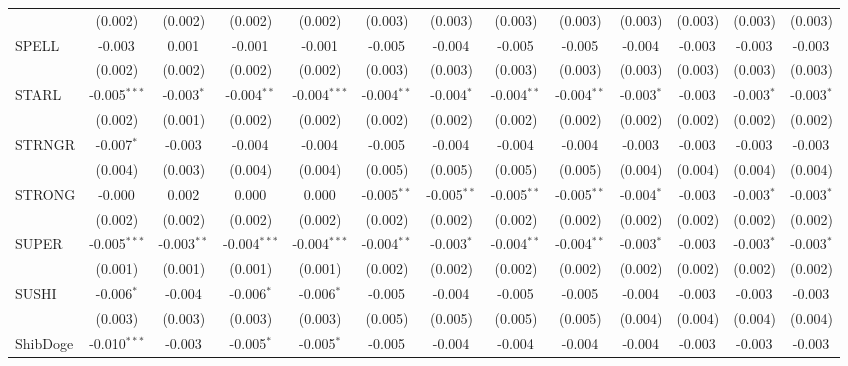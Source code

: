 \begin{table}[!htbp]
\begin{tabular}{@{\extracolsep{5pt}}lcccccccccccc}
  & (0.002) & (0.002) & (0.002) & (0.002) & (0.003) & (0.003) & (0.003) & (0.003) & (0.003) & (0.003) & (0.003) & (0.003) \\
 SPELL & -0.003$^{}$ & 0.001$^{}$ & -0.001$^{}$ & -0.001$^{}$ & -0.005$^{}$ & -0.004$^{}$ & -0.005$^{}$ & -0.005$^{}$ & -0.004$^{}$ & -0.003$^{}$ & -0.003$^{}$ & -0.003$^{}$ \\
  & (0.002) & (0.002) & (0.002) & (0.002) & (0.003) & (0.003) & (0.003) & (0.003) & (0.003) & (0.003) & (0.003) & (0.003) \\
 STARL & -0.005$^{***}$ & -0.003$^{*}$ & -0.004$^{**}$ & -0.004$^{***}$ & -0.004$^{**}$ & -0.004$^{*}$ & -0.004$^{**}$ & -0.004$^{**}$ & -0.003$^{*}$ & -0.003$^{}$ & -0.003$^{*}$ & -0.003$^{*}$ \\
  & (0.002) & (0.001) & (0.002) & (0.002) & (0.002) & (0.002) & (0.002) & (0.002) & (0.002) & (0.002) & (0.002) & (0.002) \\
 STRNGR & -0.007$^{*}$ & -0.003$^{}$ & -0.004$^{}$ & -0.004$^{}$ & -0.005$^{}$ & -0.004$^{}$ & -0.004$^{}$ & -0.004$^{}$ & -0.003$^{}$ & -0.003$^{}$ & -0.003$^{}$ & -0.003$^{}$ \\
  & (0.004) & (0.003) & (0.004) & (0.004) & (0.005) & (0.005) & (0.005) & (0.005) & (0.004) & (0.004) & (0.004) & (0.004) \\
 STRONG & -0.000$^{}$ & 0.002$^{}$ & 0.000$^{}$ & 0.000$^{}$ & -0.005$^{**}$ & -0.005$^{**}$ & -0.005$^{**}$ & -0.005$^{**}$ & -0.004$^{*}$ & -0.003$^{}$ & -0.003$^{*}$ & -0.003$^{*}$ \\
  & (0.002) & (0.002) & (0.002) & (0.002) & (0.002) & (0.002) & (0.002) & (0.002) & (0.002) & (0.002) & (0.002) & (0.002) \\
 SUPER & -0.005$^{***}$ & -0.003$^{**}$ & -0.004$^{***}$ & -0.004$^{***}$ & -0.004$^{**}$ & -0.003$^{*}$ & -0.004$^{**}$ & -0.004$^{**}$ & -0.003$^{*}$ & -0.003$^{}$ & -0.003$^{*}$ & -0.003$^{*}$ \\
  & (0.001) & (0.001) & (0.001) & (0.001) & (0.002) & (0.002) & (0.002) & (0.002) & (0.002) & (0.002) & (0.002) & (0.002) \\
 SUSHI & -0.006$^{*}$ & -0.004$^{}$ & -0.006$^{*}$ & -0.006$^{*}$ & -0.005$^{}$ & -0.004$^{}$ & -0.005$^{}$ & -0.005$^{}$ & -0.004$^{}$ & -0.003$^{}$ & -0.003$^{}$ & -0.003$^{}$ \\
  & (0.003) & (0.003) & (0.003) & (0.003) & (0.005) & (0.005) & (0.005) & (0.005) & (0.004) & (0.004) & (0.004) & (0.004) \\
 ShibDoge & -0.010$^{***}$ & -0.003$^{}$ & -0.005$^{*}$ & -0.005$^{*}$ & -0.005$^{}$ & -0.004$^{}$ & -0.004$^{}$ & -0.004$^{}$ & -0.004$^{}$ & -0.003$^{}$ & -0.003$^{}$ & -0.003$^{}$ \\

\end{tabular}
\end{table}
